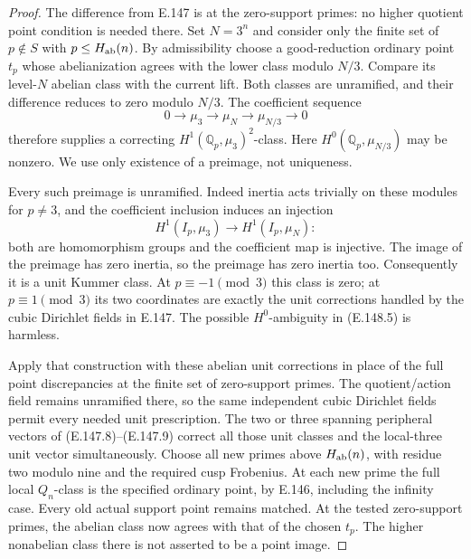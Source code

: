 \begin{proof}
The difference from E.147 is at the
zero-support primes: no higher quotient
point condition is needed there.
Set \(N=3^n\) and consider only the
finite set of \(p\notin S\) with
\(p\le H_{\rm ab}(n)\).
By admissibility choose a good-reduction
ordinary point \(t_p\) whose abelianization
agrees with the lower class modulo \(N/3\).
Compare its level-\(N\) abelian class with
the current lift. Both classes are
unramified, and their difference reduces
to zero modulo \(N/3\).
The coefficient sequence
\[
 0\longrightarrow\mu_3\longrightarrow\mu_N
       \longrightarrow\mu_{N/3}\longrightarrow0
 \tag{E.148.5}
\]
therefore supplies a correcting
\(H^1(\mathbb Q_p,\mu_3)^2\)-class.
Here \(H^0(\mathbb Q_p,\mu_{N/3})\)
may be nonzero. We use only existence
of a preimage, not uniqueness.

Every such preimage is unramified.
Indeed inertia acts trivially on these
modules for \(p\ne3\), and the coefficient
inclusion induces an injection
\[
 H^1(I_p,\mu_3)\longrightarrow H^1(I_p,\mu_N):
 \tag{E.148.6}
\]
both are homomorphism groups and the
coefficient map is injective.
The image of the preimage has zero
inertia, so the preimage has zero
inertia too.
Consequently it is a unit Kummer class.
At \(p\equiv-1\pmod3\) this class is zero;
at \(p\equiv1\pmod3\) its two coordinates
are exactly the unit corrections handled
by the cubic Dirichlet fields in E.147.
The possible \(H^0\)-ambiguity in
(E.148.5) is harmless.

Apply that construction with these
abelian unit corrections in place of
the full point discrepancies at the
finite set of zero-support primes.
The quotient/action field remains
unramified there, so the same independent
cubic Dirichlet fields permit every
needed unit prescription.
The two or three spanning peripheral
vectors of (E.147.8)--(E.147.9) correct
all those unit classes and the local-three
unit vector simultaneously.
Choose all new primes above
\(H_{\rm ab}(n)\), with residue two
modulo nine and the required cusp
Frobenius. At each new prime the full
local \(Q_n\)-class is the specified
ordinary point, by E.146, including
the infinity case.
Every old actual support point remains
matched. At the tested zero-support
primes, the abelian class now agrees
with that of the chosen \(t_p\).
The higher nonabelian class there is
not asserted to be a point image.


\end{proof}
